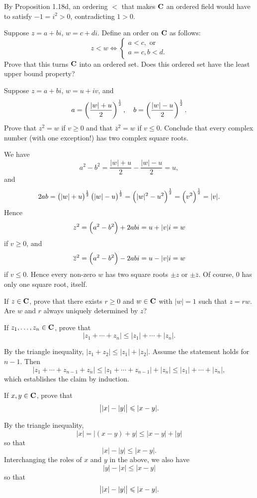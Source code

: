 \begin{solution}
By Proposition 1.18d, an ordering $<$ that makes $\mathbf C$ an ordered field would have to satisfy $-1=i^2>0$, contradicting $1>0$.
\end{solution}

\begin{prbm}
Suppose $z=a+bi$, $w=c+di$. Define an order on $\mathbf C$ as follows:
\[z<w\iff\begin{cases}
a<c,\text{ or}\\
a=c,b<d.
\end{cases}\]
Prove that this turns $\mathbf C$ into an ordered set. Does this ordered set have the least upper bound property?
\end{prbm}

\begin{prbm}
Suppose $z=a+bi$, $w=u+iv$, and
\[a=\left(\frac{|w|+u}{2}\right)^\frac{1}{2},\quad b=\left(\frac{|w|-u}{2}\right)^\frac{1}{2}.\]
Prove that $z^2=w$ if $v\ge0$ and that $\overline{z}^2=w$ if $v\le0$. Conclude that every complex number (with one exception!) has two complex square roots.
\end{prbm}

\begin{solution}
We have
\[a^2-b^2=\frac{|w|+u}{2}-\frac{|w|-u}{2}=u,\]
and
\[2ab=\left(|w|+u\right)^\frac{1}{2}\left(|w|-u\right)^\frac{1}{2}=\left(|w|^2-u^2\right)^\frac{1}{2}=\left(v^2\right)^\frac{1}{2}=|v|.\]
Hence
\[z^2=\left(a^2-b^2\right)+2abi=u+|v|i=w\]
if $v\ge0$, and
\[\overline{z}^2=\left(a^2-b^2\right)-2abi=u-|v|i=w\]
if $v\le0$. Hence every non-zero $w$ has two square roots $\pm z$ or $\pm\overline{z}$. Of course, $0$ has only one square root, itself.
\end{solution}

\begin{prbm}
If $z\in\mathbf C$, prove that there exists $r\ge0$ and $w\in\mathbf C$ with $|w|=1$ such that $z=rw$. Are $w$ and $r$ always uniquely determined by $z$?
\end{prbm}

\begin{prbm}
If $z_1,\dots,z_n\in\mathbf C$, prove that
\[|z_1+\cdots+z_n|\le|z_1|+\cdots+|z_n|.\]
\end{prbm}

\begin{solution}
By the triangle inequality, $|z_1+z_2|\le|z_1|+|z_2|$. Assume the statement holds for $n-1$. Then
\[|z_1+\cdots+z_{n-1}+z_n|\le|z_1+\cdots+z_{n-1}|+|z_n|\le|z_1|+\cdots+|z_n|,\]
which establishes the claim by induction.
\end{solution}

\begin{prbm}
If $x,y\in\mathbf C$, prove that
\[\left||x|-|y|\right|\leqslant|x-y|.\]
\end{prbm}

\begin{solution}
By the triangle inequality,
\[|x|=|(x-y)+y|\le|x-y|+|y|\]
so that
\[|x|-|y|\le|x-y|.\]
Interchanging the roles of $x$ and $y$ in the above, we also have
\[|y|-|x|\le|x-y|\]
so that
\[\left||x|-|y|\right|\leqslant|x-y|.\]
\end{solution}